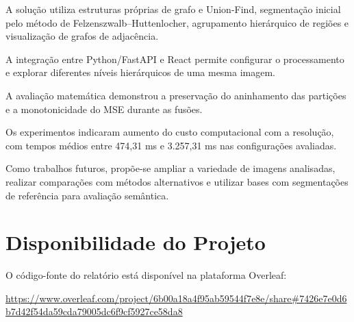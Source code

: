\documentclass[12pt]{article}
\begin{document}
A solução utiliza estruturas próprias
de grafo e Union-Find, segmentação inicial
pelo método de Felzenszwalb--Huttenlocher,
agrupamento hierárquico de regiões e
visualização de grafos de adjacência.

A integração entre Python/FastAPI e React
permite configurar o processamento
e explorar diferentes níveis hierárquicos
de uma mesma imagem.

A avaliação matemática demonstrou
a preservação do aninhamento das partições
e a monotonicidade do MSE durante as fusões.

Os experimentos indicaram aumento
do custo computacional com a resolução,
com tempos médios entre 474,31 ms
e 3.257,31 ms nas configurações avaliadas.

Como trabalhos futuros, propõe-se ampliar
a variedade de imagens analisadas,
realizar comparações com métodos alternativos
e utilizar bases com segmentações de
referência para avaliação semântica.





\section*{Disponibilidade do Projeto}
\par\smallskip

O código-fonte do relatório está disponível
na plataforma Overleaf:

\begin{center}
\url{https://www.overleaf.com/project/6b00a18a4f95ab59544f7e8e/share#7426e7e0d6b7d42f54da59cda79005dc6f9cf5927ce58da8}
\end{center}
\end{document}
